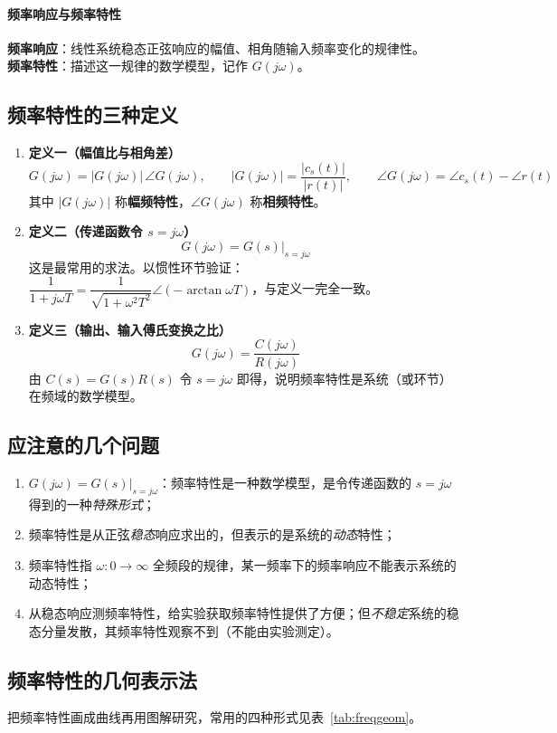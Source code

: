 \paragraph{频率响应与频率特性}
\textbf{频率响应}：线性系统稳态正弦响应的幅值、相角随输入频率变化的规律性。\\
\textbf{频率特性}：描述这一规律的数学模型，记作 $G(j\omega)$。

\subsection{频率特性的三种定义}
\begin{enumerate}
    \item \textbf{定义一（幅值比与相角差）}
    \[
    G(j\omega)=|G(j\omega)|\,\angle G(j\omega),\qquad
    |G(j\omega)|=\frac{|c_s(t)|}{|r(t)|},\qquad
    \angle G(j\omega)=\angle c_s(t)-\angle r(t)
    \]
    其中 $|G(j\omega)|$ 称\textbf{幅频特性}，$\angle G(j\omega)$ 称\textbf{相频特性}。
    \item \textbf{定义二（传递函数令 $s=j\omega$）}
    \[
    G(j\omega)=G(s)\big|_{s=j\omega}
    \]
    这是最常用的求法。以惯性环节验证：$\dfrac{1}{1+j\omega T}=\dfrac{1}{\sqrt{1+\omega^2T^2}}\angle(-\arctan\omega T)$，与定义一完全一致。
    \item \textbf{定义三（输出、输入傅氏变换之比）}
    \[
    G(j\omega)=\frac{C(j\omega)}{R(j\omega)}
    \]
    由 $C(s)=G(s)R(s)$ 令 $s=j\omega$ 即得，说明频率特性是系统（或环节）在频域的数学模型。
\end{enumerate}

\subsection{应注意的几个问题}
\begin{enumerate}
    \item $G(j\omega)=G(s)|_{s=j\omega}$：频率特性是一种数学模型，是令传递函数的 $s=j\omega$ 得到的一种\emph{特殊形式}；
    \item 频率特性是从正弦\emph{稳态}响应求出的，但表示的是系统的\emph{动态}特性；
    \item 频率特性指 $\omega:0\to\infty$ 全频段的规律，某一频率下的频率响应不能表示系统的动态特性；
    \item 从稳态响应测频率特性，给实验获取频率特性提供了方便；但\emph{不稳定}系统的稳态分量发散，其频率特性观察不到（不能由实验测定）。
\end{enumerate}

\subsection{频率特性的几何表示法}
把频率特性画成曲线再用图解研究，常用的四种形式见表~\ref{tab:freqgeom}。

